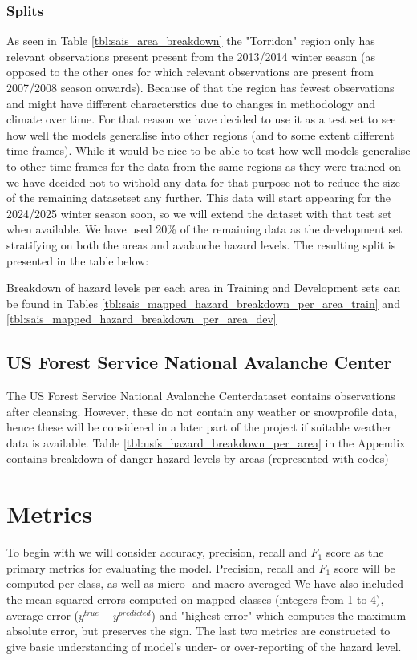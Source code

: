 \documentclass{article}
\newcommand{\usfs}{US Forest Service National Avalanche Center}
\begin{document}
\subsubsection{Splits}
	As seen in Table \ref{tbl:sais_area_breakdown} the "Torridon" region only has relevant observations present present from the 2013/2014 winter season (as opposed to the other ones for which relevant observations are present from 2007/2008 season onwards). 
	Because of that the region has fewest observations and might have different characterstics due to changes in methodology and climate over time. For that reason we have decided to use it as a test set to see how well the models generalise into other regions (and to some extent different time frames).
	While it would be nice to be able to test how well models generalise to other time frames for the data from the same regions as they were trained on we have decided not to withold any data for that purpose not to reduce the size of the remaining datasetset any further. This data will start appearing for the 2024/2025 winter season soon, so we will extend the dataset with that test set when available.
	\newline
	We have used 20\% of the remaining data as the development set stratifying on both the areas and avalanche hazard levels. The resulting split is presented in the table below:
	
	Breakdown of hazard levels per each area in Training and Development sets can be found in Tables \ref{tbl:sais_mapped_hazard_breakdown_per_area_train} and \ref{tbl:sais_mapped_hazard_breakdown_per_area_dev}

\subsection{\usfs}
	The \usfs dataset contains observations after cleansing. However, these do not contain any weather or snowprofile data, hence these will be considered in a later part of the project if suitable weather data is available.
	Table \ref{tbl:usfs_hazard_breakdown_per_area} in the Appendix contains breakdown of danger hazard levels by areas (represented with codes) 

\section{Metrics}

	To begin with we will consider accuracy, precision, recall and $F_1$ score as the primary metrics for evaluating the model. Precision, recall and $F_1$ score will be computed per-class, as well as micro- and macro-averaged
	\newline
	We have also included the mean squared errors computed on mapped classes (integers from 1 to 4), average error ($y^{true} - y^{predicted}$) and "highest error" which computes the maximum absolute error, but preserves the sign. The last two metrics are constructed to give basic understanding of model's under- or over-reporting of the hazard level.
\end{document}

